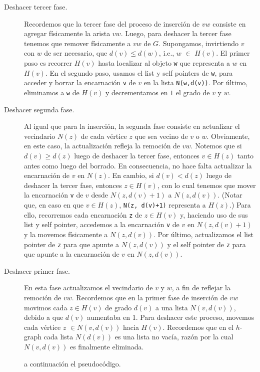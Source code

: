 \documentclass[a4paper,12pt]{article}
\makeatletter
\newcommand{\Code}[1]{\lstinline[basicstyle={\tt}]@#1@}
\makeatother
\begin{document}
\begin{description}
\item[Deshacer tercer fase.] Recordemos que la tercer fase del proceso de inserción de $vw$ consiste en agregar físicamente la arista $vw$.  Luego, para deshacer la tercer fase tenemos que remover físicamente a $vw$ de $G$.  Supongamos, invirtiendo $v$ con $w$ de ser necesario, que $d(v) \leq d(w)$, i.e., $w$ ${\in}$ $H(v)$.  El primer paso es recorrer $H(v)$ hasta localizar al objeto \texttt{w} que representa a $w$ en $H(v)$.  En el segundo paso, usamos el list y self pointers de \texttt{w}, para acceder y borrar la encarnación \texttt{v} de $v$ en la lista \Code{N(w,d(v))}.  Por último, eliminamos a \texttt{w} de $H(v)$ y decrementamos en $1$ el grado de $v$ y $w$.

\item[Deshacer segunda fase.] Al igual que para la inserción, la segunda fase consiste en actualizar el vecindario $N(z)$ de cada vértice $z$ que sea vecino de $v$ o $w$.  Obviamente, en este caso, la actualización refleja la remoción de $vw$.  Notemos que si $d(v) \geq d(z)$ luego de deshacer la tercer fase, entonces $v \in H(z)$ tanto antes como luego del borrado.  En consecuencia, no hace falta actualizar la encarnación de $v$ en $N(z)$.  En cambio, si $d(v) < d(z)$ luego de deshacer la tercer fase, entonces $z \in H(v)$, con lo cual tenemos que mover la encarnación \Code{v} de $v$ desde $N(z,d(v)+1)$ a $N(z, d(v))$.  (Notar que, en caso en que $v \in H(z)$, \Code{N(z, d(v)+1)} representa a $H(z)$.)  Para ello, recorremos cada encarnación \Code{z} de $z \in H(v)$ y, haciendo uso de sus list y self pointer, accedemos a la encarnación \Code{v} de $v$ en $N(z,d(v)+1)$ y la movemos físicamente a $N(z,d(v))$.  Por último, actualizamos el list pointer de \Code{z} para que apunte a $N(z,d(v))$ y el self pointer de \Code{z} para que apunte a la encarnación de $v$ en $N(z,d(v))$.

\item[Deshacer primer fase.] En esta fase actualizamos el vecindario de $v$ y $w$, a fin de reflejar la remoción de $vw$.  Recordemos que en la primer fase de inserción de $vw$ movimos cada $z \in H(v)$  de grado $d(v)$ a una lista $N(v,d(v))$, debido a que $d(v)$ aumentaba en 1. Para deshacer este proceso, movemos cada vértice $z$ $\in N(v,d(v))$  hacia $H(v)$. Recordemos que en el $h$-graph cada lista $N(d(v))$ es una lista no vacía, razón por la cual $N(v,d(v))$ es finalmente eliminada.

a continuación el pseudocódigo.
\end{description}
\end{document}
